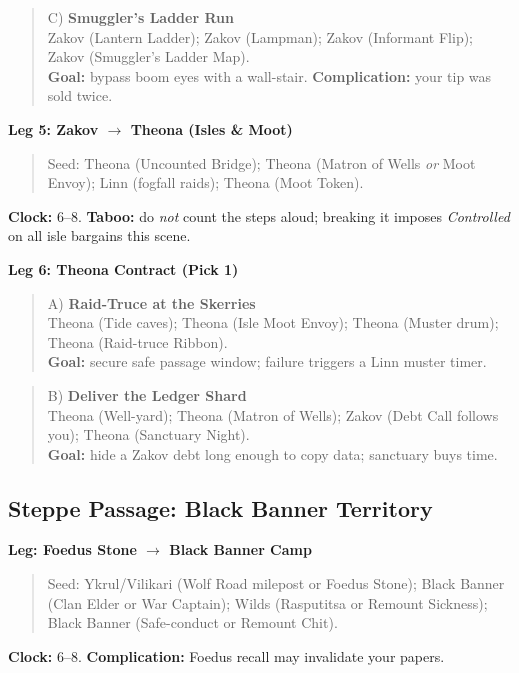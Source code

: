 \documentclass[11pt,letterpaper,twoside]{book}
\begin{document}
\begin{quote}
C) \textbf{Smuggler's Ladder Run}\\
Zakov \spadesuit{} (Lantern Ladder); Zakov \heartsuit{} (Lampman); Zakov \clubsuit{} (Informant Flip); Zakov \diamondsuit{} (Smuggler's Ladder Map).\\
\textbf{Goal:} bypass boom eyes with a wall-stair. \textbf{Complication:} your tip was sold twice.
\end{quote}

\textbf{Leg 5: Zakov $\rightarrow$ Theona (Isles \& Moot)}
\begin{quote}
Seed: Theona \spadesuit{} (Uncounted Bridge); Theona \heartsuit{} (Matron of Wells \emph{or} Moot Envoy); Linn \clubsuit{} (fogfall raids); Theona \diamondsuit{} (Moot Token).
\end{quote}
\textbf{Clock:} 6--8. \textbf{Taboo:} do \emph{not} count the steps aloud; breaking it imposes \emph{Controlled} on all isle bargains this scene.

\textbf{Leg 6: Theona Contract (Pick 1)}
\begin{quote}
A) \textbf{Raid-Truce at the Skerries}\\
Theona \spadesuit{} (Tide caves); Theona \heartsuit{} (Isle Moot Envoy); Theona \clubsuit{} (Muster drum); Theona \diamondsuit{} (Raid-truce Ribbon).\\
\textbf{Goal:} secure safe passage window; failure triggers a Linn muster timer.
\end{quote}

\begin{quote}
B) \textbf{Deliver the Ledger Shard}\\
Theona \spadesuit{} (Well-yard); Theona \heartsuit{} (Matron of Wells); Zakov \clubsuit{} (Debt Call follows you); Theona \diamondsuit{} (Sanctuary Night).\\
\textbf{Goal:} hide a Zakov debt long enough to copy data; sanctuary buys time.
\end{quote}

\subsection{Steppe Passage: Black Banner Territory}

\textbf{Leg: Foedus Stone $\rightarrow$ Black Banner Camp}
\begin{quote}
Seed: Ykrul/Vilikari \spadesuit{} (Wolf Road milepost or Foedus Stone); Black Banner \heartsuit{} (Clan Elder or War Captain); Wilds \clubsuit{} (Rasputitsa or Remount Sickness); Black Banner \diamondsuit{} (Safe-conduct or Remount Chit).
\end{quote}
\textbf{Clock:} 6--8. \textbf{Complication:} Foedus recall may invalidate your papers.
\end{document}
